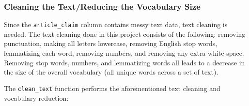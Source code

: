\documentclass[12pt]{article}
\newenvironment{Shaded}{\begin{snugshade}}{\end{snugshade}}
\newcommand{\CommentTok}[1]{\textcolor[rgb]{0.56,0.35,0.01}{\textit{#1}}}
\newcommand{\ControlFlowTok}[1]{\textcolor[rgb]{0.13,0.29,0.53}{\textbf{#1}}}
\newcommand{\KeywordTok}[1]{\textcolor[rgb]{0.13,0.29,0.53}{\textbf{#1}}}
\newcommand{\NormalTok}[1]{#1}
\newcommand{\OperatorTok}[1]{\textcolor[rgb]{0.81,0.36,0.00}{\textbf{#1}}}
\newcommand{\StringTok}[1]{\textcolor[rgb]{0.31,0.60,0.02}{#1}}
\begin{document}
\hypertarget{cleaning-the-textreducing-the-vocabulary-size}{%
\subsubsection{Cleaning the Text/Reducing the Vocabulary
Size}\label{cleaning-the-textreducing-the-vocabulary-size}}

Since the \texttt{article\_claim} column contains messy text data, text
cleaning is needed. The text cleaning done in this project consists of
the following: removing punctuation, making all letters lowercase,
removing English stop words, lemmatizing each word, removing numbers,
and removing any extra white space. Removing stop words, numbers, and
lemmatizing words all leads to a decrease in the size of the overall
vocabulary (all unique words across a set of text).

The \texttt{clean\_text} function performs the aforementioned text
cleaning and vocabulary reduction:

\begin{Shaded}
\end{Shaded}
\end{document}
